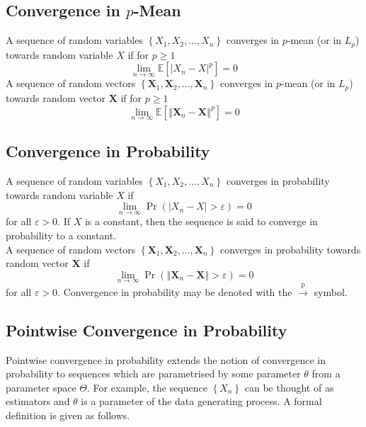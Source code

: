 \documentclass[11pt]{report} %
\begin{document}
\subsection{Convergence in $p$-Mean}

A sequence of random variables $\left\{X_{1}, X_{2}, \dots, X_{n} \right\}$ converges in $p$-mean (or in $L_{p}$) towards random variable $X$ if for $p \geq 1$
\begin{equation}
\lim_{n\to\infty}\mathbb{E}\left[\left|X_{n} - X\right|^{p}\right] = 0
\end{equation}
A sequence of random vectors $\left\{\mathbf{X}_{1}, \mathbf{X}_{2}, \dots, \mathbf{X}_{n} \right\}$ converges in $p$-mean (or in $L_{p}$) towards random vector $\mathbf{X}$ if for $p \geq 1$
\begin{equation}
\lim_{n\to\infty}\mathbb{E}\left[\left\Vert\mathbf{X}_{n} - \mathbf{X}\right\Vert^{p}\right] = 0
\end{equation}

\subsection{Convergence in Probability}

A sequence of random variables $\left\{X_{1}, X_{2}, \dots, X_{n} \right\}$ converges in probability towards random variable $X$ if
\begin{equation}
\lim_{n\to \infty}\operatorname{Pr}\left(\left|X_{n} - X\right| > \varepsilon\right) = 0
\end{equation} 
for all $\varepsilon > 0$. If $X$ is a constant, then the sequence is said to converge in probability to a constant.\\

A sequence of random vectors $\left\{\mathbf{X}_{1}, \mathbf{X}_{2}, \dots, \mathbf{X}_{n} \right\}$ converges in probability towards random vector $\mathbf{X}$ if
\begin{equation}
\lim_{n\to \infty}\operatorname{Pr}\left(\left\Vert \mathbf{X}_{n} - \mathbf{X}\right\Vert > \varepsilon\right) = 0
\end{equation} 
for all $\varepsilon > 0$. Convergence in probability may be denoted with the $\overset{\mathrm{p}}\to$ symbol.

\subsection{Pointwise Convergence in Probability}

Pointwise convergence in probability extends the notion of convergence in probability to sequences which are parametrised by some parameter $\theta$ from a parameter space $\Theta$. For example, the sequence $\left\{X_{n}\right\}$ can be thought of as estimators and $\theta$ is a parameter of the data generating process. A formal definition is given as follows. \\
 
\end{document}

